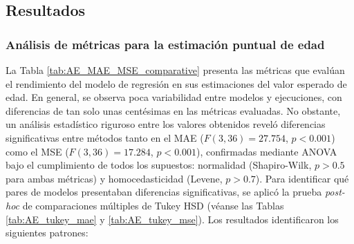 
\subsection{Resultados}

\subsubsection{Análisis de métricas para la estimación puntual de edad}

La Tabla \ref{tab:AE_MAE_MSE_comparative} presenta las métricas que evalúan el rendimiento del modelo de regresión en sus estimaciones del valor esperado de edad. En general, se observa poca variabilidad entre modelos y ejecuciones, con diferencias de tan solo unas centésimas en las métricas evaluadas. No obstante, un análisis estadístico riguroso entre los valores obtenidos reveló diferencias significativas entre métodos tanto en el MAE ($F(3, 36) = 27.754$, $p < 0.001$) como el MSE ($F(3, 36) = 17.284$, $p < 0.001$), confirmadas mediante ANOVA bajo el cumplimiento de todos los supuestos: normalidad (Shapiro-Wilk, $p > 0.5$ para ambas métricas) y homocedasticidad (Levene, $p>0.7$). Para identificar qué pares de modelos presentaban diferencias significativas, se aplicó la prueba \textit{post-hoc} de comparaciones múltiples de Tukey HSD
(véanse las Tablas \ref{tab:AE_tukey_mae} y \ref{tab:AE_tukey_mse}). Los resultados identificaron los siguientes patrones:

